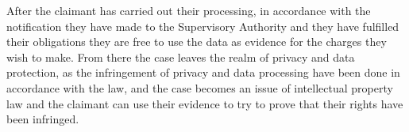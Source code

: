 After the claimant has carried out their processing, in accordance with the notification they have made to the Supervisory Authority and they have fulfilled their obligations they are free to use the data as evidence for the charges they wish to make.
From there the case leaves the realm of privacy and data protection, as the infringement of privacy and data processing have been done in accordance with the law, and the case becomes an issue of intellectual property law and the claimant can use their evidence to try to prove that their rights have been infringed.
